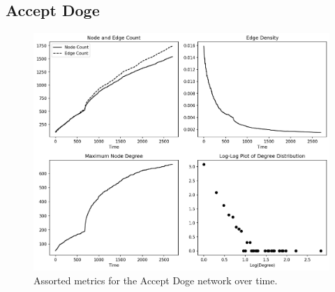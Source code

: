 \documentclass[a4paper,11pt]{article}
\begin{document}
\subsection{Accept Doge}
\begin{figure}[h!]
    \includegraphics[width=1.\linewidth]{Images/AcceptDoge/graph_data.png}
    \centering
    \caption{Assorted metrics for the Accept Doge network over time.}
\end{figure}
\end{document}
